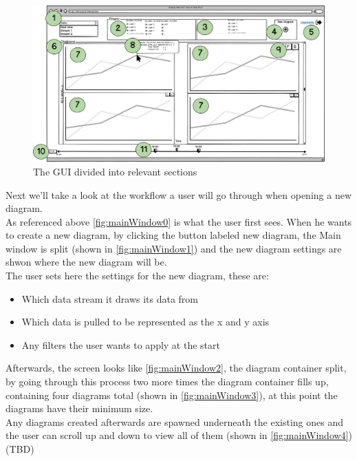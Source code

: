 \documentclass[twoside, english, draft]{Pflichtenheft}
\begin{document}
\vfill

\begin{figure}[ht]
\centering
\includegraphics[width=\textwidth]{Images/07MW.png}
	\caption{The GUI divided into relevant sections}
	\label{fig:mainWindow5}
\end{figure}

\vfill
\clearpage

Next we'll take a look at the workflow a user will go through when opening a new diagram.
\\
As referenced above \autoref{fig:mainWindow0} is what the user first sees. When he wants to create a new diagram, by clicking the button labeled new diagram, the Main window is split (shown in \autoref{fig:mainWindow1}) and the new diagram settings are shwon where the new diagram will be.
\\
The user sets here the settings for the new diagram, these are: 
\\
\begin{itemize}
\item{Which data stream it draws its data from}
\item{Which data is pulled to be represented as the x and y axis}
\item{Any filters the user wants to apply at the start}
\end{itemize}

Afterwards, the screen looks like \autoref{fig:mainWindow2}, the diagram container split, by going through this process two more times the diagram container fills up, containing four diagrams total (shown in \autoref{fig:mainWindow3}), at this point the diagrams have their minimum size.
\\
Any diagrams created afterwards are spawned underneath the existing ones and the user can scroll up and down to view all of them (shown in \autoref{fig:mainWindow4}) (TBD)
\end{document}

